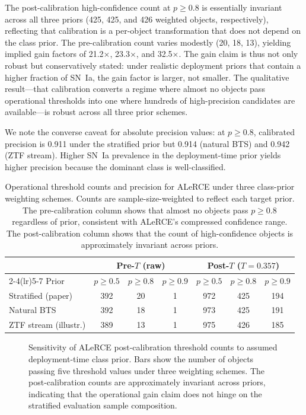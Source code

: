 \documentclass[twocolumn]{aastex631}
\begin{document}
The post-calibration high-confidence count at $p \geq 0.8$ is essentially
invariant across all three priors (425, 425, and 426 weighted objects,
respectively), reflecting that calibration is a per-object transformation
that does not depend on the class prior. The pre-calibration count
varies modestly (20, 18, 13), yielding implied gain factors of
21.2$\times$, 23.3$\times$, and 32.5$\times$. The gain claim is thus
not only robust but conservatively stated: under realistic deployment
priors that contain a higher fraction of SN~Ia, the gain factor is
larger, not smaller. The qualitative result---that calibration converts
a regime where almost no objects pass operational thresholds into one
where hundreds of high-precision candidates are available---is robust
across all three prior schemes.

We note the converse caveat for absolute precision values: at
$p \geq 0.8$, calibrated precision is 0.911 under the stratified prior
but 0.914 (natural BTS) and 0.942 (ZTF stream). Higher SN~Ia
prevalence in the deployment-time prior yields higher precision because
the dominant class is well-classified.

\begin{table}[t]
\centering
\caption{Operational threshold counts and precision for ALeRCE under
three class-prior weighting schemes. Counts are sample-size-weighted
to reflect each target prior. The pre-calibration column shows that
almost no objects pass $p \geq 0.8$ regardless of prior, consistent
with ALeRCE's compressed confidence range. The post-calibration column
shows that the count of high-confidence objects is approximately
invariant across priors.
\label{tab:prior_sensitivity}}
\begin{tabular}{lcccccc}
\toprule
 & \multicolumn{3}{c}{Pre-$T$ (raw)} & \multicolumn{3}{c}{Post-$T$ ($T = 0.357$)} \\
\cmidrule(lr){2-4}\cmidrule(lr){5-7}
Prior & $p \geq 0.5$ & $p \geq 0.8$ & $p \geq 0.9$
& $p \geq 0.5$ & $p \geq 0.8$ & $p \geq 0.9$ \\
\midrule
Stratified (paper) & 392 & 20 & 1 & 972 & 425 & 194 \\
Natural BTS        & 392 & 18 & 1 & 973 & 425 & 191 \\
ZTF stream (illustr.) & 389 & 13 & 1 & 975 & 426 & 185 \\
\bottomrule
\end{tabular}
\end{table}

\begin{figure}[t]
\caption{Sensitivity of ALeRCE post-calibration threshold counts to
assumed deployment-time class prior. Bars show the number of objects
passing five threshold values under three weighting schemes. The
post-calibration counts are approximately invariant across priors,
indicating that the operational gain claim does not hinge on the
stratified evaluation sample composition. \label{fig:prior_sensitivity}}
\end{figure}
\end{document}
